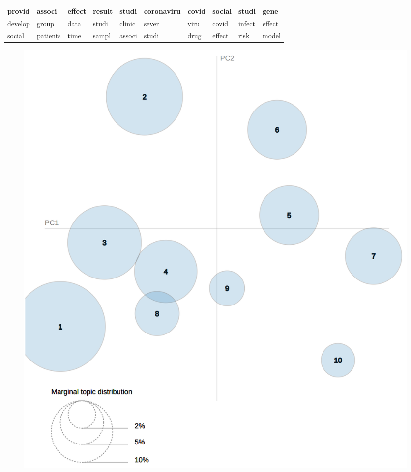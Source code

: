 \documentclass{beamer}
\begin{document}
\begin{frame}
\begin{table}[]
{\begin{tabular}{|l|l|l|l|l|l|l|l|l|l|}
provid           & associ           & effect           & result           & studi            & coronaviru       & covid            & social           & studi            & gene              \\ \hline
develop          & group            & data             & studi            & clinic           & sever            & viru             & covid            & infect           & effect            \\ \hline
social           & patients         & time             & sampl            & associ           & studi            & drug             & effect           & risk             & model             \\ \hline
\end{tabular}}
\end{table}

\begin{figure}
\includegraphics[width=0.4\linewidth]{../visualizations/lda_after_visualization.png}
\end{figure}

\end{frame}
\end{document}
